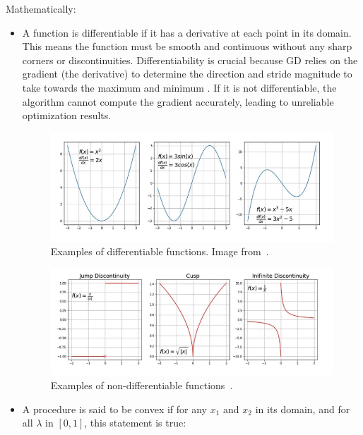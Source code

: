 \documentclass[12pt,a4paper]{report}
\begin{document}
Mathematically:
\begin{itemize}
  \item A function is differentiable if it has a derivative at each point in its domain. This means the function must be smooth and continuous without any sharp corners or discontinuities. Differentiability is crucial because GD relies on the gradient (the derivative) to determine the direction and stride magnitude to take towards the maximum and minimum . If it is not differentiable, the algorithm cannot compute the gradient accurately, leading to unreliable optimization results.
        \begin{figure}[th]
          \centering
          \includegraphics[scale=0.637]{./pics/diff_func.png}
          \caption[Examples of differentiable functions]{Examples of differentiable functions. Image from~\cite{gradientdescent}.}
          \label{fig:pic1}
        \end{figure}
        \begin{figure}[th]
          \centering
          \includegraphics[scale=0.637]{./pics/undiff_func.png}
          \caption[Examples of non-differentiable functions]{Examples of non-differentiable functions~\cite{gradientdescent}.}
          \label{fig:pic2}
        \end{figure}
  \item A procedure is said to be convex if for any \( x_1 \) and \( x_2 \) in its domain, and for all \( \lambda \) in \([0, 1]\), this statement is true:
        \begin{equation}

\end{equation}
\end{itemize}
\end{document}
